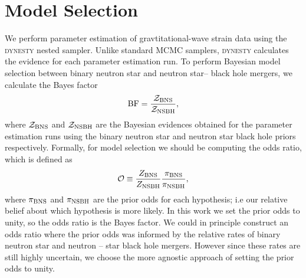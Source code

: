 \documentclass[twocolumn]{aastex631}
\begin{document}
	\section{Model Selection}\label{sec:Model Selection}
	We perform parameter estimation of gravtitational-wave strain data using the \textsc{dynesty} nested sampler. Unlike standard MCMC samplers,
	\textsc{dynesty} calculates the evidence for each parameter estimation run.   
	To perform Bayesian model selection between binary neutron star and neutron star-- black hole mergers, we calculate the Bayes factor
	\begin{equation}
		\rm BF  = \frac{\mathcal{Z_{\rm BNS}}}{\mathcal{Z_{\rm NSBH}}},
	\end{equation}
	where $\mathcal{Z}_{\rm BNS}$ and $\mathcal{Z}_{\rm NSBH}$ are the Bayesian evidences obtained for the parameter estimation runs using the binary neutron star 
	and neutron star black hole priors respectively.
	Formally, for model selection we should be computing the odds ratio, which is defined as
	\begin{equation}
		\mathcal{O} \equiv \frac{Z_{\rm BNS}}{Z_{\rm NSBH}} \frac{\pi_{\rm BNS}}{\pi_{\rm NSBH}},
	\end{equation}
	where $\pi_{\rm BNS}$ and $\pi_{\rm NSBH}$ are the prior odds for each hypothesis; i.e our relative belief about which hypothesis is more likely. 
	In this work we set the prior odds to unity, so the odds ratio is the Bayes factor. 
	We could in principle construct an odds ratio where the prior odds was informed by the relative rates of binary neutron star and neutron -- star black hole mergers. 
	However since these rates are still highly uncertain, we choose the more agnostic approach of setting the prior odds to unity. 
	{}
	
	
	
\end{document}
